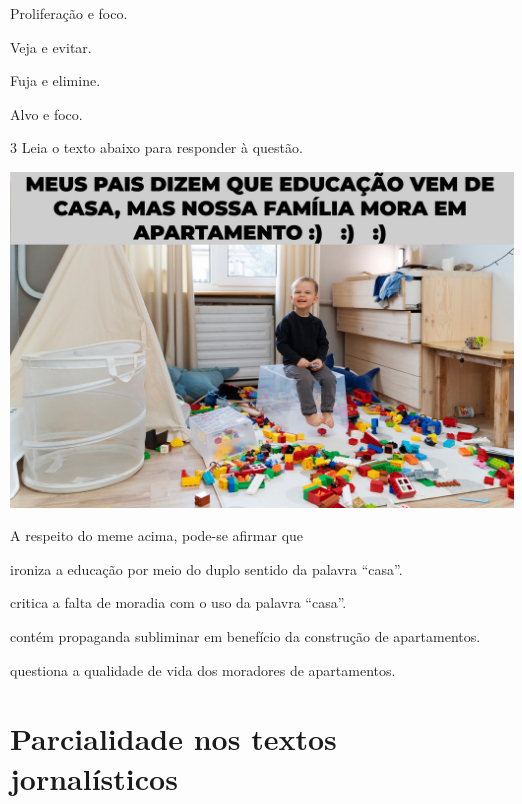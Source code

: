 \begin{escolha}
  
  \item Proliferação e foco.
  
  \item Veja e evitar.
  
  \item Fuja e elimine.
  
  \item Alvo e foco. 

\end{escolha}

\num{3} Leia o texto abaixo para responder à questão.

\includegraphics[width=\textwidth]{./imgSAEB_7_POR/media/image7.png}

A respeito do meme acima, pode-se afirmar que

\begin{escolha}
    
    \item ironiza a educação por meio do duplo sentido da palavra ``casa''.
    
    \item critica a falta de moradia com o uso da palavra ``casa''.
    
    \item contém propaganda subliminar em benefício da construção de apartamentos.
    
    \item questiona a qualidade de vida dos moradores de apartamentos.

\end{escolha}

\chapter{Parcialidade nos textos jornalísticos}

